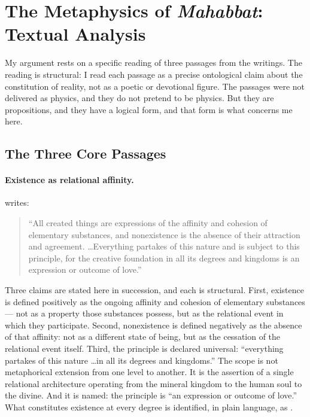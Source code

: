 
\section{The \bahai Metaphysics of \textit{Mahabbat}: Textual Analysis}
\label{sec:mahabbat}


My argument rests on a specific reading of three passages from
the \bahai writings.
The reading is structural: I read each passage as a precise ontological
claim about the constitution of reality, not as a poetic or devotional figure.
The passages were not delivered as physics, and they do not pretend to be physics.
But they are propositions, and they have a logical form, and that form is
what concerns me here.

\subsection{The Three Core Passages}

\paragraph{Existence as relational affinity.}
\AbdulBaha writes:
\begin{quote}
``All created things are expressions of the affinity and cohesion of
elementary substances, and nonexistence is the absence of their
attraction and agreement. \ldots Everything partakes of this nature and is
subject to this principle, for the creative foundation in all its
degrees and kingdoms is an expression or outcome of love.''
\citep[Talk 48]{PUP}
\end{quote}

Three claims are stated here in succession, and each is structural.
First, existence is defined positively as the ongoing affinity and cohesion of
elementary substances --- not as a property those substances possess, but as the
relational event in which they participate.
Second, nonexistence is defined negatively as the absence of that affinity:
not as a different state of being, but as the cessation of the relational event
itself.
Third, the principle is declared universal: ``everything partakes of this
nature \ldots in all its degrees and kingdoms.''
The scope is not metaphorical extension from one level to another.
It is the assertion of a single relational architecture operating from the
mineral kingdom to the human soul to the divine.
And it is named: the principle is ``an expression or outcome of love.''
What constitutes existence at every degree is identified, in plain language,
as \mahabbat.

